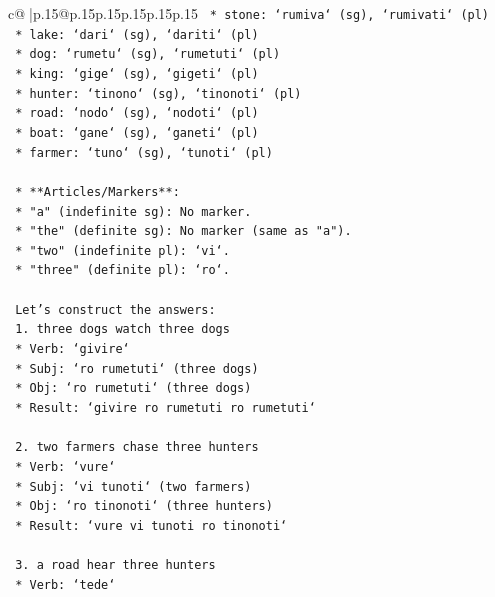 \documentclass{article}
\begin{document}
{\begin{supertabular}{c@{$\;$}|p{.15\linewidth}@{}p{.15\linewidth}p{.15\linewidth}p{.15\linewidth}p{.15\linewidth}p{.15\linewidth}}
{{{\texttt{        *   stone: `rumiva` (sg), `rumivati` (pl)} \\
\texttt{        *   lake: `dari` (sg), `dariti` (pl)} \\
\texttt{        *   dog: `rumetu` (sg), `rumetuti` (pl)} \\
\texttt{        *   king: `gige` (sg), `gigeti` (pl)} \\
\texttt{        *   hunter: `tinono` (sg), `tinonoti` (pl)} \\
\texttt{        *   road: `nodo` (sg), `nodoti` (pl)} \\
\texttt{        *   boat: `gane` (sg), `ganeti` (pl)} \\
\texttt{        *   farmer: `tuno` (sg), `tunoti` (pl)} \\
\\ 
\texttt{    *   **Articles/Markers**:} \\
\texttt{        *   "a" (indefinite sg): No marker.} \\
\texttt{        *   "the" (definite sg): No marker (same as "a").} \\
\texttt{        *   "two" (indefinite pl): `vi`.} \\
\texttt{        *   "three" (definite pl): `ro`.} \\
\\ 
\texttt{    Let's construct the answers:} \\
\texttt{    1.  three dogs watch three dogs} \\
\texttt{        *   Verb: `givire`} \\
\texttt{        *   Subj: `ro rumetuti` (three dogs)} \\
\texttt{        *   Obj: `ro rumetuti` (three dogs)} \\
\texttt{        *   Result: `givire ro rumetuti ro rumetuti`} \\
\\ 
\texttt{    2.  two farmers chase three hunters} \\
\texttt{        *   Verb: `vure`} \\
\texttt{        *   Subj: `vi tunoti` (two farmers)} \\
\texttt{        *   Obj: `ro tinonoti` (three hunters)} \\
\texttt{        *   Result: `vure vi tunoti ro tinonoti`} \\
\\ 
\texttt{    3.  a road hear three hunters} \\
\texttt{        *   Verb: `tede`} \\
}}}
\end{supertabular}}
\end{document}
